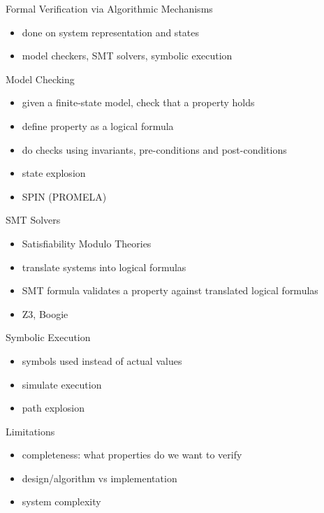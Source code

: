 \documentclass{curs}
\begin{document}
\begin{frame}{Formal Verification via Algorithmic Mechanisms}
  \begin{itemize}
    \item done on system representation and states
    \item model checkers, SMT solvers, symbolic execution
  \end{itemize}
\end{frame}

\begin{frame}{Model Checking}
  \begin{itemize}
    \item given a finite-state model, check that a property holds
    \item define property as a logical formula
    \item do checks using invariants, pre-conditions and post-conditions
    \item state explosion
    \item SPIN (PROMELA)
  \end{itemize}
\end{frame}

\begin{frame}{SMT Solvers}
  \begin{itemize}
    \item Satisfiability Modulo Theories
    \item translate systems into logical formulas
    \item SMT formula validates a property against translated logical formulas
    \item Z3, Boogie
  \end{itemize}
\end{frame}

\begin{frame}{Symbolic Execution}
  \begin{itemize}
    \item symbols used instead of actual values
    \item simulate execution
    \item path explosion
  \end{itemize}
\end{frame}

\begin{frame}{Limitations}
  \begin{itemize}
    \item completeness: what properties do we want to verify
    \item design/algorithm vs implementation
    \item system complexity
  \end{itemize}
\end{frame}
\end{document}
